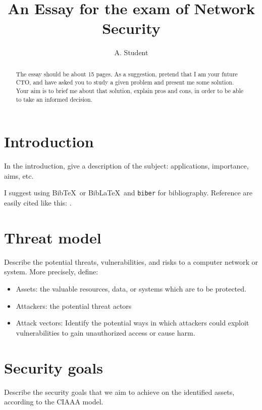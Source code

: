 \documentclass[english]{article}
\title{An Essay for the exam of Network Security}
\author{A. Student}
\begin{document}
\maketitle

\begin{abstract}
The essay should be about 15 pages. As a suggestion, pretend that I am your future CTO, and have asked you to study a given problem and present me some solution. Your aim is to brief me about that solution, explain pros and cons, in order to be able to take an informed decision.
\end{abstract}


\tableofcontents
\newpage

\section{Introduction}


In the introduction, give a description of the subject: applications, importance, aims, etc.

I suggest using Bib\TeX\ or Bib\LaTeX\ and \texttt{biber} for bibliography. Reference are easily cited like this: \cite{stallings2015computer}.

\section{Threat model}
Describe the potential threats, vulnerabilities, and risks to a computer network or system. 
More precisely, define:
\begin{itemize}
\item Assets: the valuable resources, data, or systems which are to be protected.
\item Attackers: the potential threat actors %
\item Attack vectors: Identify the potential ways in which attackers could exploit vulnerabilities to gain unauthorized access or cause harm. %
\end{itemize}

\section{Security goals}
Describe the security goals that we aim to achieve on the identified assets, according to the CIAAA model.
\end{document}
